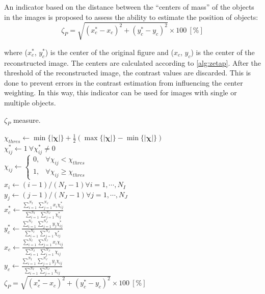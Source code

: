 				An indicator based on the distance between the ``centers of mass'' of the objects in the images is proposed to assess the ability to estimate the position of objects:
				\begin{equation}
					\zeta_P  = \sqrt{(x^*_c-x_c)^2 + (y^*_c-y_c)^2}\times 100~[\%] \label{eq:4:zeta:p}
				\end{equation}
			
				\noindent where ($x^*_c$, $y^*_c$) is the center of the original figure and ($x_c$, $y_c$) is the center of the reconstructed image. The centers are calculated according to \autoref{alg:zetap}. After the threshold of the reconstructed image, the contrast values are discarded. This is done to prevent errors in the contrast estimation from influencing the center weighting. In this way, this indicator can be used for images with single or multiple objects.
				\begin{algorithm}[!htb]
					\caption{$\zeta_P$ measure.}
					\label{alg:zetap}
					\KwIn{$\boldsymbol{\chi^{*}}$, $\boldsymbol{\chi}$}
					$\chi_{thres} \leftarrow \min\{|\boldsymbol{\chi}|\} + \frac{1}{2}\left(\max\{|\boldsymbol{\chi}|\}-\min\{|\boldsymbol{\chi}|\}\right)$\\
					$\chi^{*}_{ij}\leftarrow1~\forall\chi^{*}_{ij}\neq0$\\
					$\chi_{ij}\leftarrow\begin{cases} 0, &\forall\chi_{ij}<\chi_{thres} \\ 1, &\forall\chi_{ij}\ge\chi_{thres}\end{cases}$ \\
					$x_i \leftarrow (i-1)/(N_I-1) \forall i = 1, \cdots, N_I$\\
					$y_j \leftarrow (j-1)/(N_J-1) \forall j = 1, \cdots, N_J$\\
					$x^*_c\leftarrow \frac{\sum_{i=1}^{N_I}\sum_{j=1}^{N_J} x_i\chi^*_{ij}}{\sum_{i=1}^{N_I}\sum_{j=1}^{N_J}\chi^*_{ij}}$ \\
					$y^*_c\leftarrow \frac{\sum_{i=1}^{N_I}\sum_{j=1}^{N_J} y_j\chi^*_{ij}}{\sum_{i=1}^{N_I}\sum_{j=1}^{N_J}\chi^*_{ij}}$ \\
					$x_c\leftarrow \frac{\sum_{i=1}^{N_I}\sum_{j=1}^{N_J} x_i\chi_{ij}}{\sum_{i=1}^{N_I}\sum_{j=1}^{N_J}\chi_{ij}}$ \\
					$y_c\leftarrow \frac{\sum_{i=1}^{N_I}\sum_{j=1}^{N_J} y_j\chi_{ij}}{\sum_{i=1}^{N_I}\sum_{j=1}^{N_J}\chi_{ij}}$ \\
					$\zeta_P  = \sqrt{(x^*_c-x_c)^2 + (y^*_c-y_c)^2}\times 100~[\%]$
				\end{algorithm}
			
